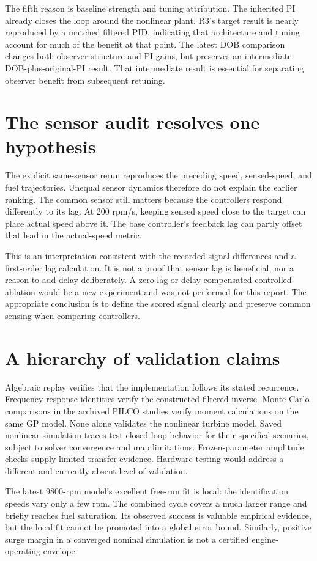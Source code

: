 The fifth reason is baseline strength and tuning attribution. The inherited PI already closes the loop around the nonlinear plant. R3's target result is nearly reproduced by a matched filtered PID, indicating that architecture and tuning account for much of the benefit at that point. The latest DOB comparison changes both observer structure and PI gains, but preserves an intermediate DOB-plus-original-PI result. That intermediate result is essential for separating observer benefit from subsequent retuning.

\section{The sensor audit resolves one hypothesis}
The explicit same-sensor rerun reproduces the preceding speed, sensed-speed, and fuel trajectories. Unequal sensor dynamics therefore do not explain the earlier ranking. The common sensor still matters because the controllers respond differently to its lag. At 200 rpm/s, keeping sensed speed close to the target can place actual speed above it. The base controller's feedback lag can partly offset that lead in the actual-speed metric.

This is an interpretation consistent with the recorded signal differences and a first-order lag calculation. It is not a proof that sensor lag is beneficial, nor a reason to add delay deliberately. A zero-lag or delay-compensated controlled ablation would be a new experiment and was not performed for this report. The appropriate conclusion is to define the scored signal clearly and preserve common sensing when comparing controllers.

\section{A hierarchy of validation claims}
Algebraic replay verifies that the implementation follows its stated recurrence. Frequency-response identities verify the constructed filtered inverse. Monte Carlo comparisons in the archived PILCO studies verify moment calculations on the same GP model. None alone validates the nonlinear turbine model. Saved nonlinear simulation traces test closed-loop behavior for their specified scenarios, subject to solver convergence and map limitations. Frozen-parameter amplitude checks supply limited transfer evidence. Hardware testing would address a different and currently absent level of validation.

The latest 9800-rpm model's excellent free-run fit is local: the identification speeds vary only a few rpm. The combined cycle covers a much larger range and briefly reaches fuel saturation. Its observed success is valuable empirical evidence, but the local fit cannot be promoted into a global error bound. Similarly, positive surge margin in a converged nominal simulation is not a certified engine-operating envelope.

